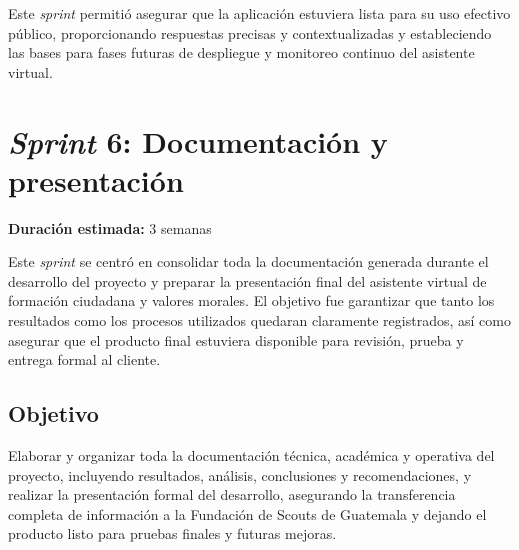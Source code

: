 Este \textit{sprint} permitió asegurar que la aplicación estuviera lista para
su uso efectivo público, proporcionando respuestas precisas y contextualizadas
y estableciendo las bases para fases futuras de despliegue y monitoreo continuo
del asistente virtual.

\section{\textit{Sprint} 6: Documentación y presentación}
\textbf{Duración estimada:} 3 semanas

Este \textit{sprint} se centró en consolidar toda la documentación generada
durante el desarrollo del proyecto y preparar la presentación final del
asistente virtual de formación ciudadana y valores morales. El objetivo fue
garantizar que tanto los resultados como los procesos utilizados quedaran
claramente registrados, así como asegurar que el producto final estuviera
disponible para revisión, prueba y entrega formal al cliente.

\subsection{Objetivo}
Elaborar y organizar toda la documentación técnica, académica y operativa del
proyecto, incluyendo resultados, análisis, conclusiones y recomendaciones, y
realizar la presentación formal del desarrollo, asegurando la transferencia
completa de información a la Fundación de Scouts de Guatemala y dejando el
producto listo para pruebas finales y futuras mejoras.

